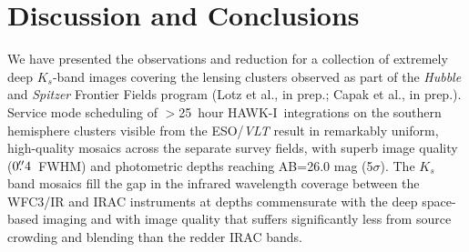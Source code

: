 \documentclass[preprint2]{aastex6}
\gdef\HAWKI{\mbox{HAWK-I}}
\begin{document}


\section{Discussion and Conclusions}
\label{s:discussion}

 
We have presented the observations and reduction for a collection of extremely deep $K_s$-band images covering the lensing clusters observed as part of the \textit{Hubble} and \textit{Spitzer} Frontier Fields program (Lotz et al., in prep.; Capak et al., in prep.).  Service mode scheduling of $>$25~hour \HAWKI\ integrations on the southern hemisphere clusters visible from the ESO/\textit{VLT} result in remarkably uniform, high-quality mosaics across the separate survey fields, with superb image quality ($0\mbox{$.\!\!^{\prime\prime}$}4$~FWHM) and photometric depths reaching AB=26.0 mag (5$\sigma$).  The $K_s$ band mosaics fill the gap in the infrared wavelength coverage between the WFC3/IR and IRAC instruments at depths commensurate with the deep space-based imaging and with image quality that suffers significantly less from source crowding and blending than the redder IRAC bands.  
\end{document}
